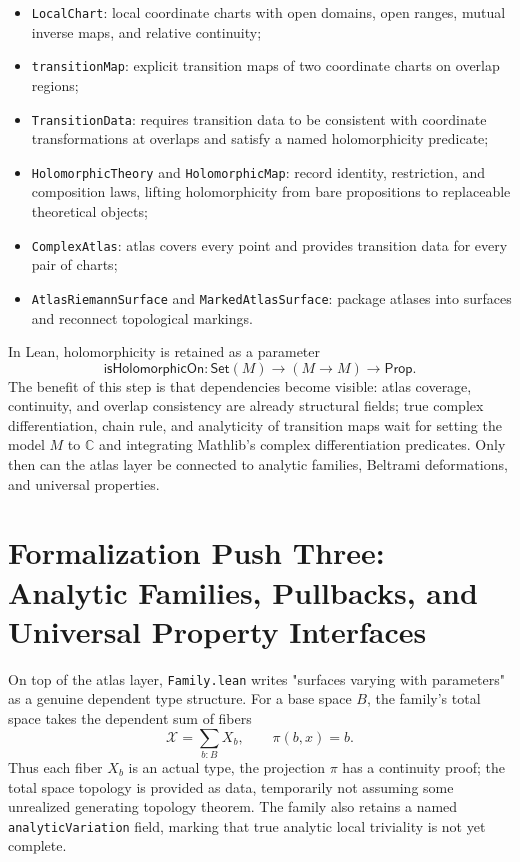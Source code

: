 \documentclass[UTF8,a4paper,11pt]{article}
\begin{document}
\begin{itemize}
  \item \texttt{LocalChart}: local coordinate charts with open domains, open ranges, mutual inverse maps, and relative continuity;
  \item \texttt{transitionMap}: explicit transition maps of two coordinate charts on overlap regions;
  \item \texttt{TransitionData}: requires transition data to be consistent with coordinate transformations at overlaps and satisfy a named holomorphicity predicate;
  \item \texttt{HolomorphicTheory} and \texttt{HolomorphicMap}: record identity, restriction, and composition laws, lifting holomorphicity from bare propositions to replaceable theoretical objects;
  \item \texttt{ComplexAtlas}: atlas covers every point and provides transition data for every pair of charts;
  \item \texttt{AtlasRiemannSurface} and \texttt{MarkedAtlasSurface}: package atlases into surfaces and reconnect topological markings.
\end{itemize}

In Lean, holomorphicity is retained as a parameter
\[
  \mathsf{isHolomorphicOn}:\mathsf{Set}(M)\to(M\to M)\to\mathsf{Prop}.
\]
The benefit of this step is that dependencies become visible: atlas coverage, continuity, and overlap consistency are already structural fields; true complex differentiation, chain rule, and analyticity of transition maps wait for setting the model $M$ to $\mathbb C$ and integrating Mathlib's complex differentiation predicates. Only then can the atlas layer be connected to analytic families, Beltrami deformations, and universal properties.

\section{Formalization Push Three: Analytic Families, Pullbacks, and Universal Property Interfaces}

On top of the atlas layer, \texttt{Family.lean} writes "surfaces varying with parameters" as a genuine dependent type structure. For a base space $B$, the family's total space takes the dependent sum of fibers
\[
  \mathcal X=\sum_{b:B}X_b,
  \qquad \pi(b,x)=b.
\]
Thus each fiber $X_b$ is an actual type, the projection $\pi$ has a continuity proof; the total space topology is provided as data, temporarily not assuming some unrealized generating topology theorem. The family also retains a named \texttt{analyticVariation} field, marking that true analytic local triviality is not yet complete.
\end{document}
